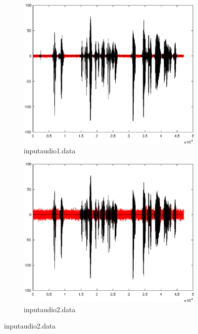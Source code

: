 \documentclass[10pt,twocolumn]{article}
\begin{document}
{\begin{figure}[ht]
  \centering
  \begin{subfigure}{0.45\linewidth}
    \centering
    \includegraphics[scale=0.22]{images/res1.eps}
    \caption{inputaudio1.data}
  \end{subfigure}
\begin{subfigure}{0.45\linewidth}
    \centering
    \includegraphics[scale=0.22]{images/res2.eps}
    \caption{inputaudio2.data}
  \end{subfigure}
  \par\medskip

\end{figure}}
\end{document}
